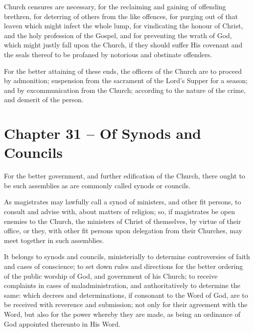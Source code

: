 \begin{outerlst}[left=0pt,labelsep=0pt]
\begin{innerlst}[resume*]
\item Church censures are necessary, for the reclaiming and gaining of offending brethren, for deterring of others from the like offences, for purging out of that leaven which might infect the whole lump, for vindicating the honour of Christ, and the holy profession of the Gospel, and for preventing the wrath of God, which might justly fall upon the Church, if they should suffer His covenant and the seals thereof to be profaned by notorious and obstinate offenders.   

\item For the better attaining of these ends, the officers of the Church are to proceed by admonition; suspension from the sacrament of the Lord's Supper for a season; and by excommunication from the Church; according to the nature of the crime, and demerit of the person.  
\end{innerlst}

\item
{}
\section{Chapter 31 -- Of Synods and Councils}
\begin{innerlst}[resume*]

\item For the better government, and further edification of the Church, there ought to be such assemblies as are commonly called synods or councils.   

\item As magistrates may lawfully call a synod of ministers, and other fit persons, to consult and advise with, about matters of religion; so, if magistrates be open enemies to the Church, the ministers of Christ of themselves, by virtue of their office, or they, with other fit persons upon delegation from their Churches, may meet together in such assemblies.

\item It belongs to synods and councils, ministerially to determine controversies of faith and cases of conscience; to set down rules and directions for the better ordering of the public worship of God, and government of his Church; to receive complaints in cases of maladministration, and authoritatively to determine the same: which decrees and determinations, if consonant to the Word of God, are to be received with reverence and submission; not only for their agreement with the Word, but also for the power whereby they are made, as being an ordinance of God appointed thereunto in His Word.   


\end{innerlst}
\end{outerlst}
